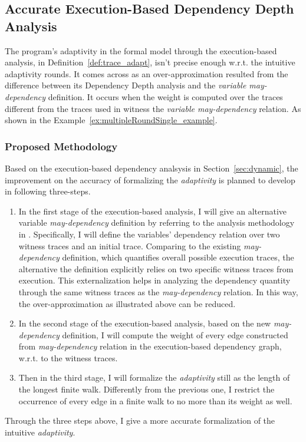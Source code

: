 \subsection{Accurate Execution-Based Dependency Depth Analysis}
\label{subsec:furthers-dep-depth}
%
The program's adaptivity in the formal model through the execution-based analysis,
in Definition~\ref{def:trace_adapt}, isn't precise enough w.r.t. the intuitive adaptivity rounds.
It comes across as an over-approximation 
resulted from the difference between its Dependency Depth analysis and the \emph{variable may-dependency} definition.
It occurs when the weight is computed over the traces different from the traces used in 
witness the \emph{variable may-dependency} relation.
As shown in the Example~\ref{ex:multipleRoundSingle_example}.

\subsubsection{Proposed Methodology}
\label{subsubsec:furthers-dep-depth}
% 
Based on the execution-based dependency analsysis in Section~\ref{sec:dynamic}, the improvement on the accuracy 
of formalizing the
\emph{adaptivity} is planned to develop in following three-steps.
\begin{enumerate}
\item In the first stage of the execution-based analysis, 
I will give an alternative variable \emph{may-dependency} definition 
by referring to the analysis methodology in \cite{Cousot19a}.
%
Specifically, I will define the variables' dependency relation over two witness traces and an initial trace. Comparing to 
the existing \emph{may-dependency} definition, which quantifies overall possible execution traces, the alternative
the definition explicitly relies on two specific witness traces from execution.
This externalization helps in analyzing the dependency quantity through the same 
witness traces as the \emph{may-dependency} relation. In this way, the over-approximation as illustrated above
can be reduced.
%
\item In the second stage of the execution-based analysis, 
based on the new \emph{may-dependency} definition,
I will compute the weight of every edge constructed from 
\emph{may-dependency} relation in the execution-based dependency graph, w.r.t. to the witness traces.
%
\item Then in the third stage, I will formalize the \emph{adaptivity} still as the 
length of the longest finite walk. Differently from the previous one, I restrict 
the occurrence of every edge in a finite walk to no more than its weight as well.
\end{enumerate}
Through the three steps above, I give a more accurate formalization of the intuitive \emph{adaptivity}.
%
